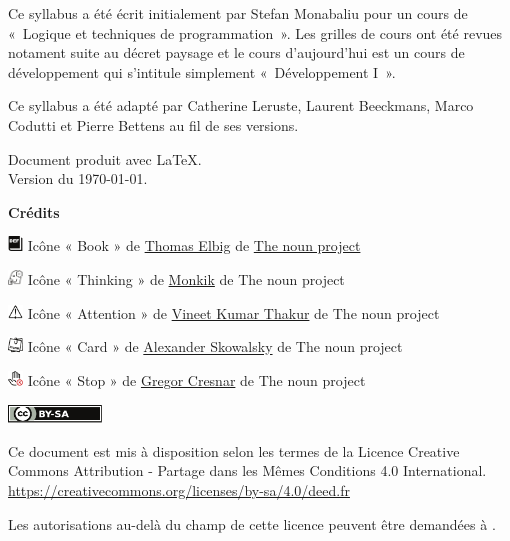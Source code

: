 
\thispagestyle{empty}

Ce syllabus a été écrit initialement par Stefan Monabaliu pour un cours de
«~Logique et techniques de programmation~». Les grilles de cours ont été revues
notament suite au décret paysage et le cours d'aujourd'hui est un cours de
développement qui s'intitule simplement «~Développement I~».

Ce syllabus a été adapté par Catherine Leruste, Laurent Beeckmans, Marco
Codutti et Pierre Bettens au fil de ses versions. 

\bigskip
\noindent
Document produit avec \LaTeX.
\\Version du \today.

\vfill

\textbf{Crédits}

\includegraphics[width=4mm]{icon/definition}
Icône « Book » de 
\href{https://thenounproject.com/dergraph}{Thomas Elbig} de 
\href{https://thenounproject.com}{The noun project}

\includegraphics[width=4mm]{icon/reflexion}
Icône « Thinking » de 
\href{https://thenounproject.com/kukkik_jung/}{Monkik} de 
The noun project

\includegraphics[width=4mm]{icon/attention}
Icône « Attention » de 
\href{https://thenounproject.com/vkvineet}{Vineet Kumar Thakur} de
The noun project

\includegraphics[width=4mm]{icon/fiche}
Icône « Card » de 
\href{https://thenounproject.com/sandorsz}{Alexander Skowalsky} de
The noun project

\includegraphics[width=4mm]{icon/dont}
Icône « Stop » de 
\href{https://thenounproject.com/grega.cresnar}{Gregor Cresnar} de
The noun project




\vspace{1cm}
\includegraphics[width=25mm]{images/cc-by-sa}

Ce document est mis à disposition selon les termes de la Licence Creative
\\Commons Attribution - Partage dans les Mêmes Conditions 4.0 International.
\\\url{https://creativecommons.org/licenses/by-sa/4.0/deed.fr}

Les autorisations au-delà du champ de cette licence
peuvent être demandées à \texttt{\contact}.

